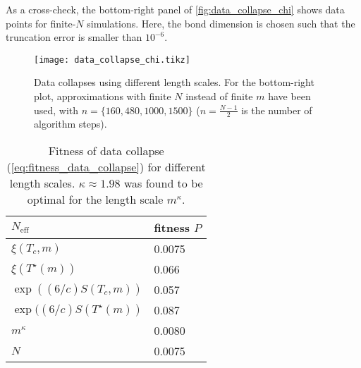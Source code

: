 As a cross-check, the bottom-right panel of \autoref{fig:data_collapse_chi} shows data points for finite-$N$
simulations. Here, the bond dimension is chosen such that the truncation error is smaller than $10^{-6}$.

\begin{figure}
  \texttt{[image: data\_collapse\_chi.tikz]}
  \caption{Data collapses using different length scales.
  For the bottom-right plot, approximations with finite $N$ instead of finite $m$ have been used,
  with $n = \{160, 480, 1000, 1500 \}$ ($n = \frac{N - 1}{2}$ is the number of algorithm
  steps).}\label{fig:data_collapse_chi}
\end{figure}

\begin{table}[]
\centering
\begin{tabular}{@{}ll@{}} \toprule
$N_{\text{eff}}$                  & fitness $P$ \\ \midrule
$\xi(T_c, m)$                     & 0.0075      \\
$\xi(T^{\star}(m))$               & 0.066       \\
$\exp((6/c)S(T_c, m))$            & 0.057       \\
$\exp((6/c)S(T^{\star}(m))$       & 0.087       \\
$m^{\kappa}$                      & 0.0080      \\
$N$                               & 0.0075      \\ \bottomrule
\end{tabular}
  \caption{Fitness of data collapse (\autoref{eq:fitness_data_collapse}) for different length scales.
  $\kappa \approx 1.98$ was found to be optimal for the length scale $m^{\kappa}$.}
  \label{table:fitness_data_collapse_different_length_scales}
\end{table}
